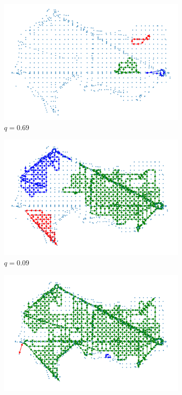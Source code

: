 \begin{figure}[htb]
\centering
\begin{subfigure}[b]{0.25\textwidth}
    \centering
    \includegraphics[width=\linewidth]{images/069.png}
    \caption{$q=0.69$}
    \label{fig: q=0.69}
\end{subfigure}
\hfill
\begin{subfigure}[b]{0.25\textwidth}
    \centering
    \includegraphics[width=\linewidth]{images/009.png}
    \caption{$q=0.09$}
    \label{fig: q=0.09}
\end{subfigure}
\hfill
\begin{subfigure}[b]{0.25\textwidth}
    \centering
    \includegraphics[width=\linewidth]{images/007.png}

\end{subfigure}
\end{figure}
